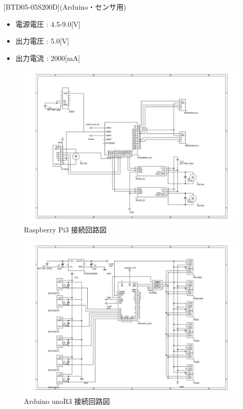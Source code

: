 \documentclass[10pt,a4j]{jarticle}
\begin{document}
[BTD05-05S200D](Arduino・センサ用)
\begin{itemize}
 \item 電源電圧 : 4.5-9.0[V]
 \item 出力電圧 : 5.0[V]
 \item 出力電流 : 2000[mA]
\end{itemize}

\newpage
\begin{figure}[t]
 \centering
 \includegraphics[width=0.9\hsize]{RCR_raspberryPi3.pdf}
    \caption{Raspberry Pi3 接続回路図}
    \label{c_raspberry}
\end{figure}
\begin{figure}[b]
 \centering
 \includegraphics[width=0.9\hsize]{RCR_arduino.pdf}
    \caption{Arduino unoR3 接続回路図}
    \label{c_arduino}
\end{figure}
\newpage
\end{document}
